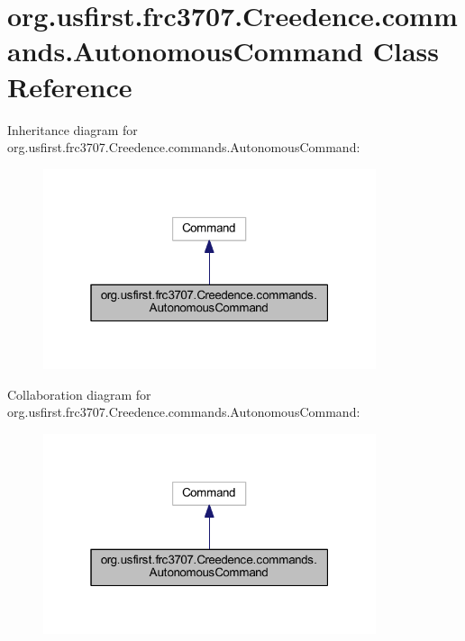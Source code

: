 \hypertarget{classorg_1_1usfirst_1_1frc3707_1_1_creedence_1_1commands_1_1_autonomous_command}{}\section{org.\+usfirst.\+frc3707.\+Creedence.\+commands.\+Autonomous\+Command Class Reference}
\label{classorg_1_1usfirst_1_1frc3707_1_1_creedence_1_1commands_1_1_autonomous_command}


Inheritance diagram for org.\+usfirst.\+frc3707.\+Creedence.\+commands.\+Autonomous\+Command\+:
\nopagebreak
\begin{figure}[H]
\begin{center}
\leavevmode
\includegraphics[width=277pt]{classorg_1_1usfirst_1_1frc3707_1_1_creedence_1_1commands_1_1_autonomous_command__inherit__graph}
\end{center}
\end{figure}


Collaboration diagram for org.\+usfirst.\+frc3707.\+Creedence.\+commands.\+Autonomous\+Command\+:
\nopagebreak
\begin{figure}[H]
\begin{center}
\leavevmode
\includegraphics[width=277pt]{classorg_1_1usfirst_1_1frc3707_1_1_creedence_1_1commands_1_1_autonomous_command__coll__graph}
\end{center}
\end{figure}

